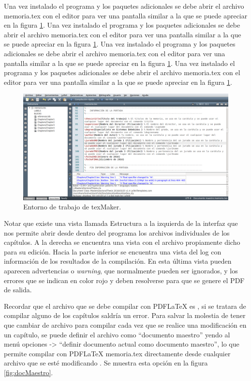 Una vez instalado el programa y los paquetes adicionales se debe abrir el
archivo memoria.tex con el editor para ver una pantalla similar a la que se
puede apreciar en la figura \ref{fig:texmaker}. Una vez instalado el programa y
los paquetes adicionales se debe abrir el archivo memoria.tex con el editor
para ver una pantalla similar a la que se puede apreciar en la figura
\ref{fig:texmaker}. Una vez instalado el programa y los paquetes adicionales se
debe abrir el archivo memoria.tex con el editor para ver una pantalla similar a
la que se puede apreciar en la figura \ref{fig:texmaker}. Una vez instalado el
programa y los paquetes adicionales se debe abrir el archivo memoria.tex con el
editor para ver una pantalla similar a la que se puede apreciar en la figura
\ref{fig:texmaker}.

\vspace{1cm}

\begin{figure}[htbp]
      \centering
      \includegraphics[width=.5\textwidth]{./Figures/texmaker.png}
      \caption{Entorno de trabajo de texMaker.}
      \label{fig:texmaker}
\end{figure}

\vspace{1cm}

Notar que existe una vista llamada Estructura a la izquierda de la interfaz que
nos permite abrir desde dentro del programa los archivos individuales de los
capítulos. A la derecha se encuentra una vista con el archivo propiamente dicho
para su edición. Hacia la parte inferior se encuentra una vista del log con
información de los resultados de la compilación. En esta última vista pueden
aparecen advertencias o \textit{warning}, que normalmente pueden ser ignorados,
y los errores que se indican en color rojo y deben resolverse para que se
genere el PDF de salida.

Recordar que el archivo que se debe compilar con PDFLaTeX es
, si se tratara de compilar alguno de los capítulos saldría
un error. Para salvar la molestia de tener que cambiar de archivo para compilar
cada vez que se realice una modificación en un capítulo, se puede definir el
archivo  como ``documento maestro'' yendo al menú opciones ->
``definir documento actual como documento maestro'', lo que permite compilar
con PDFLaTeX memoria.tex directamente desde cualquier archivo que se esté
modificando . Se muestra esta opción en la figura \ref{fig:docMaestro}.

